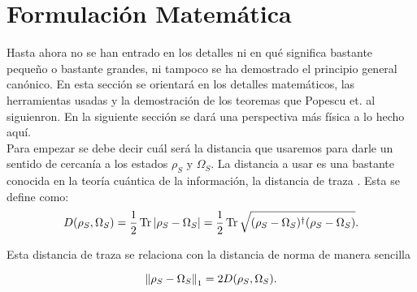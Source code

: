 \section{Formulación Matemática}

Hasta ahora no se han entrado en los detalles ni en qué significa bastante pequeño o bastante grandes, ni tampoco se ha demostrado el principio general canónico. En esta sección se orientará en los detalles matemáticos, las herramientas usadas y la demostración de los teoremas que Popescu et. al siguienron. En la siguiente sección se dará una perspectiva más física a lo hecho aquí.
\\
Para empezar se debe decir cuál será la distancia que usaremos para darle un sentido de cercanía a los estados $\rho_{S}$ y $\Omega_{S}$. La distancia a usar es una bastante conocida en la teoría cuántica de la información, la distancia de traza \cite{NielsenInformation}. Esta se define como:
\begin{equation}
D(\rho_{S}, \Omega_{S})= \frac{1}{2} \Tr |\rho_{S} -\Omega_{S}|=\frac{1}{2} \Tr \sqrt{(\rho_{S} -\Omega_{S})^{\dag}(\rho_{S} -\Omega_{S})}.
\end{equation}

Esta distancia de traza se relaciona con la distancia de norma de manera sencilla

\begin{equation}
\norm{\rho_{S}-\Omega_{S}}_{1}=2 D(\rho_{S}, \Omega_{S}).
\end{equation}


